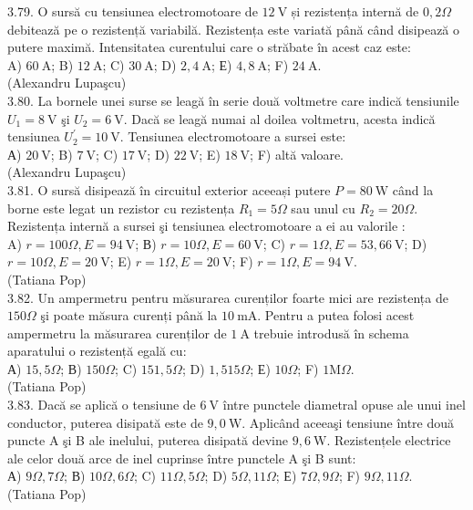 \documentclass[10pt]{article}
\begin{document}
3.79. O sursă cu tensiunea electromotoare de  $12 \mathrm{~V}$ și rezistența internă de $0,2 \Omega$ debitează pe o rezistență variabilă. Rezistența este variată până când disipează o putere maximă. Intensitatea curentului care o străbate în acest caz este:\\ A)  $60 \mathrm{~A}$; B) $12 \mathrm{~A}$; C) $30 \mathrm{~A}$; D) $2,4 \mathrm{~A}$; Е) $4,8 \mathrm{~A}$; F) $24 \mathrm{~A}$.\\ (Alexandru Lupaşcu)\\

3.80. La bornele unei surse se leagă în serie două voltmetre care indică tensiunile $U_{1}=8 \mathrm{~V}$ şi $U_{2}=6 \mathrm{~V}$. Dacă se leagă numai al doilea voltmetru, acesta indică tensiunea $U_{2}^{\prime}=10 \mathrm{~V}$. Tensiunea electromotoare a sursei este:\\ А) $20 \mathrm{~V}$; B)  $7 \mathrm{~V}$; C)  $17 \mathrm{~V}$; D)  $22 \mathrm{~V}$; E)  $18 \mathrm{~V}$; F) altă valoare.\\ (Alexandru Lupaşcu)\\

3.81. O sursă disipează în circuitul exterior aceeași putere $P=80 \mathrm{~W}$ când la borne este legat un rezistor cu rezistența $R_{1}=5 \Omega$ sau unul cu $R_{2}=20 \Omega$. Rezistența internă a sursei şi tensiunea electromotoare a ei au valorile :\\ A) $r=100 \Omega, E=94 \mathrm{~V}$; В) $r=10 \Omega, E=60 \mathrm{~V}$; C) $r=1 \Omega, E=53,66 \mathrm{~V}$; D) $r=10 \Omega, E=20 \mathrm{~V}$; E) $r=1 \Omega, E=20 \mathrm{~V}$; F) $r=1 \Omega, E=94 \mathrm{~V}$.\\ (Tatiana Pop)\\

3.82. Un ampermetru pentru măsurarea curenților foarte mici are rezistența de $150 \Omega$ şi poate măsura curenți până la $10 \mathrm{~mA}$. Pentru a putea folosi acest ampermetru la măsurarea curenților de $1 \mathrm{~A}$ trebuie introdusă în schema aparatului o rezistență egală cu:\\ А) $15,5 \Omega$; В) $150 \Omega$; C) $151,5 \Omega$; D) $1,515 \Omega$; Е) $10 \Omega$; F) $1 \mathrm{M} \Omega$.\\ (Tatiana Pop)\\

3.83. Dacă se aplică o tensiune de $6 \mathrm{~V}$ între punctele diametral opuse ale unui inel conductor, puterea disipată este de $9,0 \mathrm{~W}$. Aplicând aceeaşi tensiune între două puncte A şi B ale inelului, puterea disipată devine $9,6 \mathrm{~W}$. Rezistențele electrice ale celor două arce de inel cuprinse între punctele A şi B sunt:\\ А) $9 \Omega , 7 \Omega$; В) $10 \Omega , 6 \Omega$; C) $11 \Omega , 5 \Omega$; D) $5 \Omega , 11 \Omega$; Е) $7 \Omega , 9 \Omega$; F) $9 \Omega , 11 \Omega$.\\ (Tatiana Pop)\\
\end{document}
